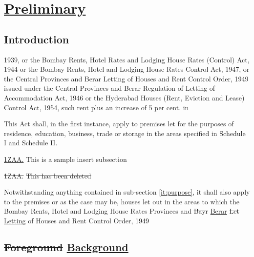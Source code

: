 \documentclass[default]{report}
\newcommand{\ins}[1]{\ul{#1}}
\newcommand{\del}[1]{\st{#1}}
\newcommand{\subs}[2]{\del{#1} \ins{#2}}
\newcommand{\sectionedit}[2]{%
	\titlelabel{#1\quad}
	\section{#2}
	\titlelabel{\thesection\quad}
}
\newcommand{\chapteredit}[2]{%
	\titlelabel{#1\quad}
	\chapter{#2}
	\titlelabel{\thechapter\quad}
}
\begin{document}
\tableofcontents

\chapteredit{\ins{2}}{\ins{Preliminary}}


\section{Introduction}

1939, or the Bombay Rents, Hotel Rates and Lodging House Rates
(Control) Act, 1944 or the Bombay Rents, Hotel and Lodging House Rates
Control Act, 1947, or the Central Provinces and Berar Letting of
Houses and Rent Control Order, 1949 issued under the Central Provinces
and Berar Regulation of Letting of Accommodation Act, 1946 or the
Hyderabad Houses (Rent, Eviction and Lease) Control Act, 1954, such
rent plus an increase of 5 per cent. in
\begin{list}{.}{%
    \settowidth{}
    \leftmargin{}
    \advance\leftmargin{}
    \advance\leftmargin{} 
    \advance\leftmargin{} 
  }
\item This Act shall, in the first instance, apply to premises let for
  the purposes of residence, education, business, trade or storage in
  the areas specified in Schedule I and Schedule II.
  \label{it:purpose}
\item [\ins{1ZAA.}] This is a sample insert subsection
\item [\del{1ZAA.}] \del{This has been deleted}
\item Notwithstanding anything contained in sub-section
  \ref{it:purpose}, it shall
  also apply to the premises or as the case may be, houses let out in
  the areas to which the Bombay Rents, Hotel and Lodging House Rates
  Provinces and \del{Bayr} \ins{Berar} \subs{Let}{Letting} of Houses and Rent Control Order, 1949
\end{list}


	

\sectionedit{\del{2} \ins{3}}{\del{Foreground} \ins{Background}}
\end{document}
